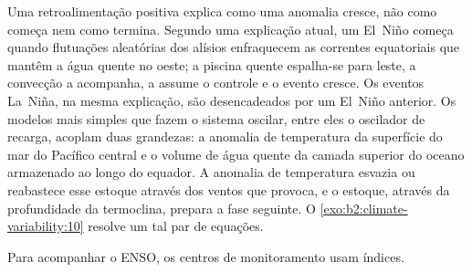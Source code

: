 \begin{omfigure}
\centering
{}
\par{}
\end{omfigure}

Uma retroalimentação positiva explica como uma anomalia cresce, não como começa nem como termina. Segundo uma explicação atual,
um El~Niño começa quando flutuações aleatórias dos alísios enfraquecem as correntes equatoriais que
mantêm a água quente no oeste; a piscina quente espalha-se para leste, a convecção a acompanha, a
 assume o controle e o evento cresce. Os eventos La~Niña, na mesma explicação, são
desencadeados por um El~Niño anterior. Os modelos mais simples que fazem o sistema oscilar, entre eles o
oscilador de recarga, acoplam duas grandezas: a anomalia de temperatura da superfície do mar do Pacífico
central e o volume de água quente da camada superior do oceano armazenado ao longo do equador. A anomalia
de temperatura esvazia ou reabastece esse estoque através dos ventos que provoca, e o estoque, através da
profundidade da termoclina, prepara a fase seguinte. O \cref{exo:b2:climate-variability:10} resolve
um tal par de equações.

Para acompanhar o ENSO, os centros de monitoramento usam índices.

